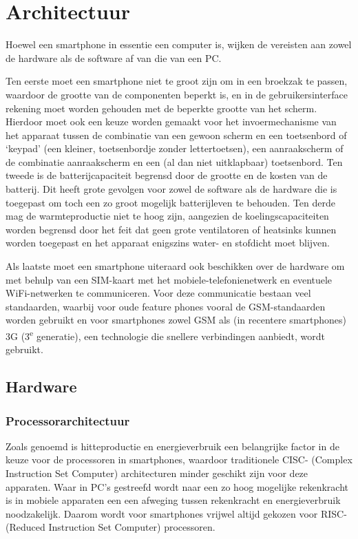 \chapter{Architectuur}

Hoewel een smartphone in essentie een computer is, wijken de vereisten aan zowel de hardware als de software af van die van een PC.

Ten eerste moet een smartphone niet te groot zijn om in een broekzak te passen, waardoor de grootte van de componenten beperkt is, en in de gebruikersinterface rekening moet worden gehouden met de beperkte grootte van het scherm.
Hierdoor moet ook een keuze worden gemaakt voor het invoermechanisme van het apparaat tussen de combinatie van een gewoon scherm en een toetsenbord of `keypad' (een kleiner, toetsenbordje zonder lettertoetsen), een aanraakscherm of de combinatie aanraakscherm en een (al dan niet uitklapbaar) toetsenbord.
Ten tweede is de batterijcapaciteit begrensd door de grootte en de kosten van de batterij.
Dit heeft grote gevolgen voor zowel de software als de hardware die is toegepast om toch een zo groot mogelijk batterijleven te behouden.
Ten derde mag de warmteproductie niet te hoog zijn, aangezien de koelingscapaciteiten worden begrensd door het feit dat geen grote ventilatoren of heatsinks kunnen worden toegepast en het apparaat enigszins water- en stofdicht moet blijven.

Als laatste moet een smartphone uiteraard ook beschikken over de hardware om met behulp van een SIM-kaart met het mobiele-telefonienetwerk en eventuele WiFi-netwerken te communiceren. Voor deze communicatie bestaan veel standaarden, waarbij voor oude feature phones vooral de GSM-standaarden worden gebruikt en voor smartphones zowel GSM als (in recentere smartphones) 3G (3\textsuperscript{e} generatie), een technologie die snellere verbindingen aanbiedt, wordt gebruikt.


\section{Hardware}

\subsection{Processorarchitectuur}

Zoals genoemd is hitteproductie en energieverbruik een belangrijke factor in de keuze voor de processoren in smartphones, waardoor traditionele CISC- (Complex Instruction Set Computer) architecturen minder geschikt zijn voor deze apparaten.
Waar in PC's gestreefd wordt naar een zo hoog mogelijke rekenkracht is in mobiele apparaten een een afweging tussen rekenkracht en energieverbruik noodzakelijk.
Daarom wordt voor smartphones vrijwel altijd gekozen voor RISC- (Reduced Instruction Set Computer) processoren.

